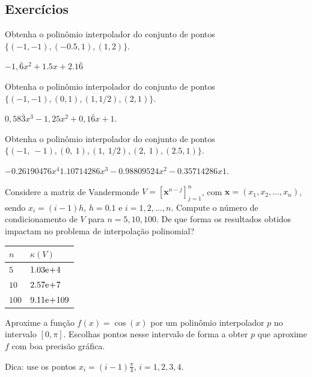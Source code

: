 \subsection{Exercícios}

\begin{exer}
  Obtenha o polinômio interpolador do conjunto de pontos $\{(-1, -1), (-0.5, 1), (1, 2)\}$.
\end{exer}
\begin{resp}
  $-1,\bar{6}x^2 + 1.5x + 2.1\bar{6}$
\end{resp}

\begin{exer}
  Obtenha o polinômio interpolador do conjunto de pontos $\{(-1, -1), (0, 1), (1, 1/2), (2, 1)\}$.
\end{exer}
\begin{resp}
  $0,58\bar{3}x^3 - 1,25x^2 + 0,1\bar{6}x + 1$. 
\end{resp}

\begin{exer}
  Obtenha o polinômio interpolador do conjunto de pontos $\{(-1,~-1), (0,~1), (1,~1/2), (2,~1), (2.5, 1)\}$.
\end{exer}
\begin{resp}
  $-0.26190476x^4  1.10714286x^3 -0.98809524x^2 -0.35714286x  1$.  
\end{resp}

\begin{exer}
  Considere a matriz de Vandermonde $V = [\pmb{x}^{n-j}]_{j=1}^{n}$, com $\pmb{x} = (x_1, x_2, \dotsc, x_n)$, sendo $x_i = (i-1)h$, $h=0.1$ e $i = 1, 2, \dotsc, n$. Compute o número de condicionamento de $V$ para $n=5, 10, 100$. De que forma os resultados obtidos impactam no problema de interpolação polinomial?
\end{exer}
\begin{resp}
  \begin{tabular}{ll}
    $n$ & $\kappa(V)$\\\hline
    $5$ & $1.03\mathrm{e}\!+\!4$\\
    $10$ & $2.57\mathrm{e}\!+\!7$\\
    $100$ & $9.11\mathrm{e}\!+\!109$\\\hline
  \end{tabular}
\end{resp}

\begin{exer}
  Aproxime a função $f(x) = \cos(x)$ por um polinômio interpolador $p$ no intervalo $[0, \pi]$. Escolhas pontos nesse intervalo de forma a obter $p$ que aproxime $f$ com boa precisão gráfica.
\end{exer}
\begin{resp}
  Dica: use os pontos $x_i = (i-1)\frac{\pi}{4}$, $i=1,2,3,4$.
\end{resp}

